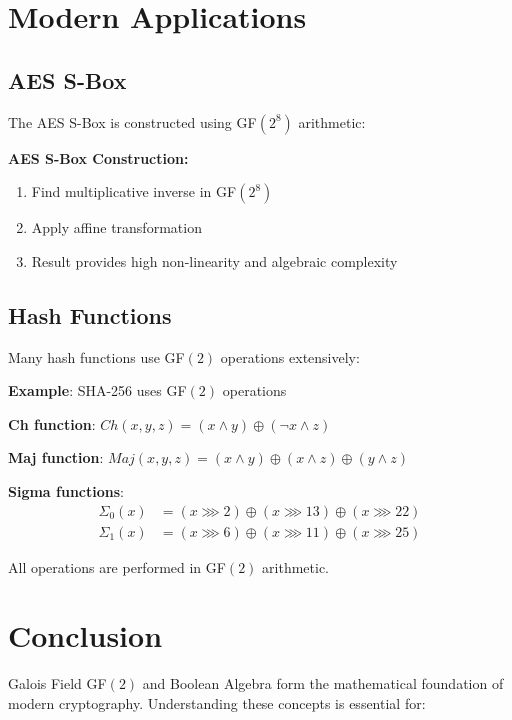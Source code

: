 \documentclass[11pt,a4paper]{article}
\begin{document}
\section{Modern Applications}

\subsection{AES S-Box}

The AES S-Box is constructed using GF$(2^8)$ arithmetic:

\begin{theorybox}
\textbf{AES S-Box Construction:}
\begin{enumerate}
    \item Find multiplicative inverse in GF$(2^8)$
    \item Apply affine transformation
    \item Result provides high non-linearity and algebraic complexity
\end{enumerate}
\end{theorybox}

\subsection{Hash Functions}

Many hash functions use GF$(2)$ operations extensively:

\begin{examplebox}
\textbf{Example}: SHA-256 uses GF$(2)$ operations

\textbf{Ch function}: $Ch(x,y,z) = (x \wedge y) \oplus (\neg x \wedge z)$

\textbf{Maj function}: $Maj(x,y,z) = (x \wedge y) \oplus (x \wedge z) \oplus (y \wedge z)$

\textbf{Sigma functions}:
\begin{align*}
\Sigma_0(x) &= (x \ggg 2) \oplus (x \ggg 13) \oplus (x \ggg 22) \\
\Sigma_1(x) &= (x \ggg 6) \oplus (x \ggg 11) \oplus (x \ggg 25)
\end{align*}

All operations are performed in GF$(2)$ arithmetic.
\end{examplebox}

\section{Conclusion}

Galois Field GF$(2)$ and Boolean Algebra form the mathematical foundation of modern cryptography. Understanding these concepts is essential for:
\end{document}
